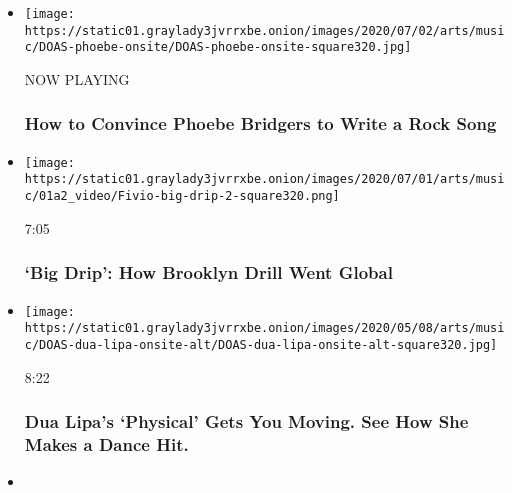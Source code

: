 \begin{itemize}
\item
  \texttt{[image: https://static01.graylady3jvrrxbe.onion/images/2020/07/02/arts/music/DOAS-phoebe-onsite/DOAS-phoebe-onsite-square320.jpg]}

  NOW PLAYING

  \hypertarget{how-to-convince-phoebe-bridgers-to-write-a-rock-song-2}{%
  \subsubsection{How to Convince Phoebe Bridgers to Write a Rock
  Song}\label{how-to-convince-phoebe-bridgers-to-write-a-rock-song-2}}
\item
  \href{https://www.nytimes3xbfgragh.onion/video/arts/music/100000007062892/big-drip-fivio-foreign-brooklyn-drill.html?action=click\&module=video-series-bar\&region=header\&pgtype=Article\&playlistId=video/diaryofasong}{}

  \texttt{[image: https://static01.graylady3jvrrxbe.onion/images/2020/07/01/arts/music/01a2\_video/Fivio-big-drip-2-square320.png]}

  7:05

  \hypertarget{big-drip-how-brooklyn-drill-went-global}{%
  \subsubsection{`Big Drip': How Brooklyn Drill Went
  Global}\label{big-drip-how-brooklyn-drill-went-global}}
\item
  \href{https://www.nytimes3xbfgragh.onion/video/arts/music/100000007062893/dua-lipa-physical-song.html?action=click\&module=video-series-bar\&region=header\&pgtype=Article\&playlistId=video/diaryofasong}{}

  \texttt{[image: https://static01.graylady3jvrrxbe.onion/images/2020/05/08/arts/music/DOAS-dua-lipa-onsite-alt/DOAS-dua-lipa-onsite-alt-square320.jpg]}

  8:22

  \hypertarget{dua-lipas-physical-gets-you-moving-see-how-she-makes-a-dance-hit}{%
  \subsubsection{Dua Lipa's `Physical' Gets You Moving. See How She
  Makes a Dance
  Hit.}\label{dua-lipas-physical-gets-you-moving-see-how-she-makes-a-dance-hit}}
\item
  \href{https://www.nytimes3xbfgragh.onion/video/arts/music/100000006962812/grimes-delete-forever.html?action=click\&module=video-series-bar\&region=header\&pgtype=Article\&playlistId=video/diaryofasong}{}


\end{itemize}
